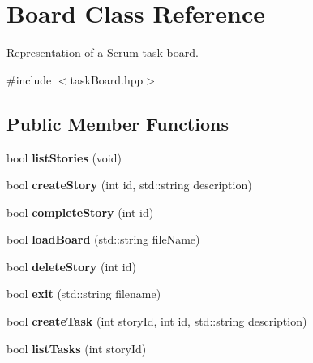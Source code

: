 \hypertarget{classBoard}{\section{Board Class Reference}
\label{classBoard}
}


Representation of a Scrum task board.  




{\ttfamily \#include $<$task\-Board.\-hpp$>$}

\subsection*{Public Member Functions}
\begin{DoxyCompactItemize}
\item 
\hypertarget{classBoard_aaaebf8dd8f11554ded807021f34161c8}{bool {\bfseries list\-Stories} (void)}\label{classBoard_aaaebf8dd8f11554ded807021f34161c8}

\item 
\hypertarget{classBoard_aeaecb30a99e29b511441074fa9efebe0}{bool {\bfseries create\-Story} (int id, std\-::string description)}\label{classBoard_aeaecb30a99e29b511441074fa9efebe0}

\item 
\hypertarget{classBoard_a0b5748a4477188a21197eae0675a7afd}{bool {\bfseries complete\-Story} (int id)}\label{classBoard_a0b5748a4477188a21197eae0675a7afd}

\item 
\hypertarget{classBoard_a437518b81979b9c06e6216003f6b3874}{bool {\bfseries load\-Board} (std\-::string file\-Name)}\label{classBoard_a437518b81979b9c06e6216003f6b3874}

\item 
\hypertarget{classBoard_a2c42bbdccb3aded7800329e959fa414f}{bool {\bfseries delete\-Story} (int id)}\label{classBoard_a2c42bbdccb3aded7800329e959fa414f}

\item 
\hypertarget{classBoard_ae4c436da4f7f3191a9096bc5fdf1d849}{bool {\bfseries exit} (std\-::string filename)}\label{classBoard_ae4c436da4f7f3191a9096bc5fdf1d849}

\item 
\hypertarget{classBoard_a57baa2f410a74bcf422f5f4b50e2705a}{bool {\bfseries create\-Task} (int story\-Id, int id, std\-::string description)}\label{classBoard_a57baa2f410a74bcf422f5f4b50e2705a}

\item 
\hypertarget{classBoard_abf2d89b68049a7a0af1ac447ea8e0731}{bool {\bfseries list\-Tasks} (int story\-Id)}\label{classBoard_abf2d89b68049a7a0af1ac447ea8e0731}


\end{DoxyCompactItemize}
